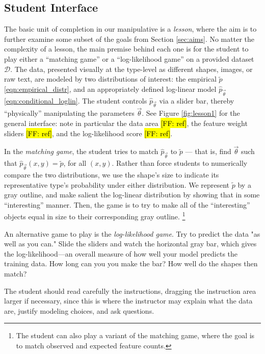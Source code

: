 \documentclass[11pt,letterpaper]{article}
\newcommand{\Note}[1]{}
\renewcommand{\Note}[1]{\hl{[#1]}}
\newcommand{\NoteSigned}[3]{{\sethlcolor{#2}\Note{#1: #3}}}
\newcommand{\NoteFF}[1]{\NoteSigned{FF}{LightBlue}{#1}}
\newcommand{\Data}[0]{\ensuremath{\mathcal{D}}}
\begin{document}
\subsection{Student Interface}
The basic unit of completion in our manipulative is a \textit{lesson}, where 
the aim is to further examine some subset of the goals from Section \ref{sec:aims}.
No matter the complexity of a lesson, the main premise behind each one is for the 
student to play either a ``matching game'' or a ``log-likelihood game'' on a provided 
dataset \Data{}. The data, presented visually at the type-level as different shapes, 
images, or raw text, are modeled by two distributions of interest: the empirical 
$\tilde{p}$ \eqref{eqn:empirical_distr}, and an appropriately
defined log-linear model $\hat{p}_{\vec{\theta}}$ \eqref{eqn:conditional_loglin}.
The student controls $\hat{p}_{\vec{\theta}}$ via a slider bar, thereby ``physically'' 
manipulating the parameters $\vec{\theta}$. See Figure \ref{fig:lesson1} for the
general interface: note in particular the data area \NoteFF{ref}, the feature weight
sliders \NoteFF{ref}, and the log-likelihood score \NoteFF{ref}.

In the \textit{matching game}, the student tries to match $\hat{p}_{\vec{\theta}}$ to 
$\tilde{p}$ --- that is, find $\vec{\theta}$ such that $\hat{p}_{\vec{\theta}}(x,y) 
= \tilde{p}$, for all $(x,y)$. Rather than force students to numerically compare the
two distributions, we use the shape's size to indicate its representative type's probability
under either distribution. We represent $\tilde{p}$ by a gray 
outline, and make salient the log-linear distribution by showing that in some 
``interesting'' manner. Then, the game is to try to make all of the ``interesting'' objects 
equal in size to their corresponding gray outline.
\footnote{The student can also play a variant of the matching game, where the goal
is to match observed and expected feature counts.}

An alternative game to play is the \textit{log-likelihood game}. Try to predict the data "as well as you can." Slide the sliders and watch the horizontal gray bar, which gives the log-likelihood—an overall measure of how well your model predicts the training data. How long can you you make the bar? How well do the shapes then match?

The student should read carefully the instructions, dragging the instruction 
area larger if necessary, since this is where the instructor may explain what the data 
are, justify modeling choices, and ask questions. 
\end{document}
